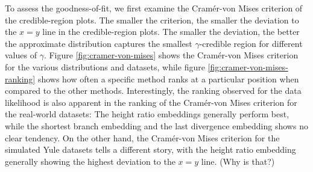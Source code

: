 \documentclass[10pt,letterpaper]{article}
\begin{document}
To assess the goodness-of-fit, we first examine the Cramér-von Mises criterion of the credible-region plots. The smaller the criterion, the smaller the deviation to the $x=y$ line in the credible-region plots. The smaller the deviation, the better the approximate distribution captures the smallest $\gamma$-credible region for different values of $\gamma$. Figure \ref{fig:cramer-von-mises} shows the Cramér-von Mises criterion for the various distributions and datasets, while figure \ref{fig:cramer-von-mises-ranking} shows how often a specific method ranks at a particular position when compared to the other methods. Interestingly, the ranking observed for the data likelihood is also apparent in the ranking of the Cramér-von Mises criterion for the real-world datasets: The height ratio embeddings generally perform best, while the shortest branch embedding and the last divergence embedding shows no clear tendency. On the other hand, the Cramér-von Mises criterion for the simulated Yule datasets tells a different story, with the height ratio embedding generally showing the highest deviation to the $x=y$ line. (Why is that?)
\end{document}
